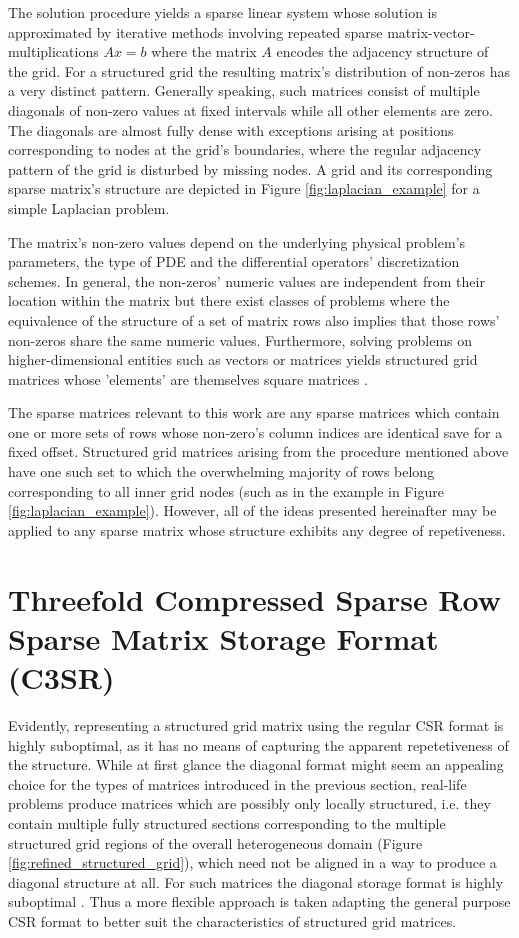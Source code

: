 \documentclass{article}
\begin{document}
    The solution procedure yields a sparse linear system whose solution is approximated by iterative methods involving repeated sparse matrix-vector-multiplications $Ax = b$ where the matrix $A$ encodes the adjacency structure of the grid. For a structured grid the resulting matrix's distribution of non-zeros has a very distinct pattern. Generally speaking, such matrices consist of multiple diagonals of non-zero values at fixed intervals while all other elements are zero. The diagonals are almost fully dense with exceptions arising at positions corresponding to nodes at the grid's boundaries, where the regular adjacency pattern of the grid is disturbed by missing nodes. A grid and its corresponding sparse matrix's structure are depicted in Figure \ref{fig:laplacian_example} for a simple Laplacian problem.

    The matrix's non-zero values depend on the underlying physical problem's parameters, the type of PDE and the differential operators' discretization schemes. In general, the non-zeros' numeric values are independent from their location within the matrix but there exist classes of problems where the equivalence of the structure of a set of matrix rows also implies that those rows' non-zeros share the same numeric values. Furthermore, solving problems on higher-dimensional entities such as vectors or matrices yields structured grid matrices whose 'elements' are themselves square matrices \cite{Godwin2013}.

    The sparse matrices relevant to this work are any sparse matrices which contain one or more sets of rows whose non-zero's column indices are identical save for a fixed offset. Structured grid matrices arising from the procedure mentioned above have one such set to which the overwhelming majority of rows belong corresponding to all inner grid nodes (such as in the example in Figure \ref{fig:laplacian_example}). However, all of the ideas presented hereinafter may be applied to any sparse matrix whose structure exhibits any degree of repetiveness.

\section{Threefold Compressed Sparse Row Sparse Matrix Storage Format (C3SR)}

  Evidently, representing a structured grid matrix using the regular CSR format is highly suboptimal, as it has no means of capturing the apparent repetetiveness of the structure. While at first glance the diagonal format might seem an appealing choice for the types of matrices introduced in the previous section, real-life problems produce matrices which are possibly only locally structured, i.e. they contain multiple fully structured sections corresponding to the multiple structured grid regions of the overall heterogeneous domain (Figure \ref{fig:refined_structured_grid}), which need not be aligned in a way to produce a diagonal structure at all. For such matrices the diagonal storage format is highly suboptimal \cite{Bell2011}. Thus a more flexible approach is taken adapting the general purpose CSR format to better suit the characteristics of structured grid matrices.
\end{document}
